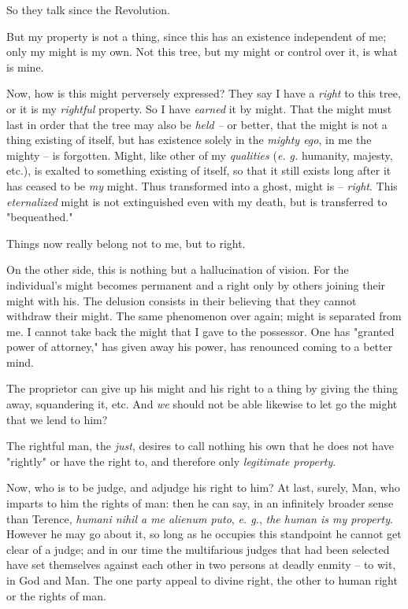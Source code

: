 \documentclass[a4paper]{book}
\begin{document}
So they talk since the Revolution.

But my property is not a thing, since this has an existence independent of me; 
only my might is my own. Not this tree, but my might or control over it, is 
what is mine.

Now, how is this might perversely expressed? They say I have a \textit{right} 
to this tree, or it is my \textit{rightful} property. So I have 
\textit{earned} it by might. That the might must last in order that the tree 
may also be \textit{held --} or better, that the might is not a thing existing 
of itself, but has existence solely in the \textit{mighty ego}, in me the 
mighty -- is forgotten. Might, like other of my \textit{qualities} (\textit{e. 
g.} humanity, majesty, etc.), is exalted to something existing of itself, so 
that it still exists long after it has ceased to be \textit{my} might. Thus 
transformed into a ghost, might is -- \textit{right}. This 
\textit{eternalized} might is not extinguished even with my death, but is 
transferred to "{}bequeathed."{}

Things now really belong not to me, but to right.

On the other side, this is nothing but a hallucination of vision. For the 
individual's might becomes permanent and a right only by others joining their 
might with his. The delusion consists in their believing that they cannot 
withdraw their might. The same phenomenon over again; might is separated from 
me. I cannot take back the might that I gave to the possessor. One has 
"{}granted power of attorney,"{} has given away his power, has renounced 
coming to a better mind.

The proprietor can give up his might and his right to a thing by giving the 
thing away, squandering it, etc. And \textit{we} should not be able likewise 
to let go the might that we lend to him?

The rightful man, the \textit{just}, desires to call nothing his own that he 
does not have "{}rightly"{} or have the right to, and therefore only 
\textit{legitimate property}.

Now, who is to be judge, and adjudge his right to him? At last, surely, Man, 
who imparts to him the rights of man: then he can say, in an infinitely 
broader sense than Terence, \textit{humani nihil a me alienum puto}, 
\textit{e. g.}, \textit{the human is my property}. However he may go about it, 
so long as he occupies this standpoint he cannot get clear of a judge; and in 
our time the multifarious judges that had been selected have set themselves 
against each other in two persons at deadly enmity -- to wit, in God and Man. 
The one party appeal to divine right, the other to human right or the rights 
of man.
\end{document}
